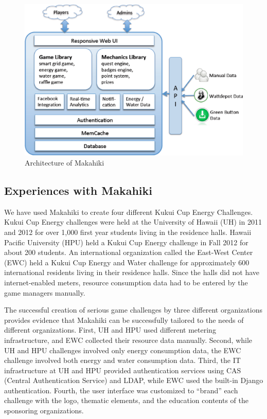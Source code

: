 \documentclass{sigchi}
\begin{document}
\begin{figure}[ht!]
  \center
  \includegraphics[width=\columnwidth]{makahiki-system-architecture}
  \caption{Architecture of Makahiki}
  \label{fig:makahiki-architecture}
\end{figure}

\subsection{Experiences with Makahiki}

We have used Makahiki to create four different Kukui Cup Energy Challenges. Kukui Cup
Energy challenges were held at the University of Hawaii (UH) in 2011 and 2012 for over
1,000 first year students living in the residence halls. Hawaii Pacific University (HPU)
held a Kukui Cup Energy challenge in Fall 2012 for about 200 students. An international
organization called the East-West Center (EWC) held a Kukui Cup Energy and Water challenge
for approximately 600 international residents living in their residence halls. Since the
halls did not have internet-enabled meters, resource consumption data had to be entered by
the game managers manually.

The successful creation of serious game challenges by three different organizations
provides evidence that Makahiki can be successfully tailored
to the needs of different organizations. First, UH and HPU used different metering
infrastructure, and EWC collected their resource data manually.  Second, while UH and HPU
challenges involved only energy consumption data, the EWC challenge involved both energy
and water consumption data. Third, the IT infrastructure at UH and HPU provided
authentication services using CAS (Central Authentication Service) and LDAP, while EWC
used the built-in Django authentication.  Fourth, the user interface was customized to
``brand'' each challenge with the logo, thematic elements, and the education contents of
the sponsoring organizations.
\end{document}
